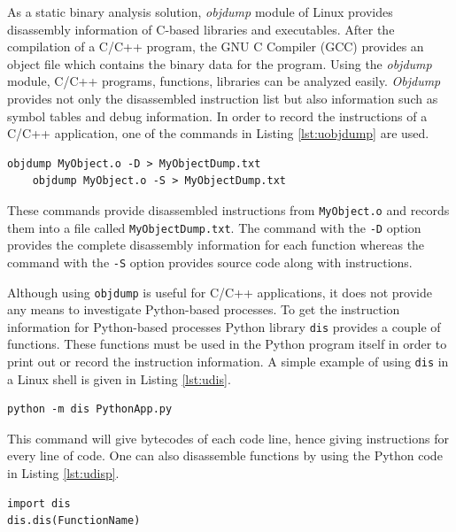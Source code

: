 As a static binary analysis solution, \textit{objdump} \cite{objdump} module of Linux provides disassembly information of C-based libraries and executables. After the compilation of a C/C++ program, the GNU C Compiler (GCC) provides an object file which contains the binary data for the program. Using the \textit{objdump} module, C/C++ programs, functions, libraries can be analyzed easily. \textit{Objdump} provides not only the disassembled instruction list but also information such as symbol tables and debug information. In order to record the instructions of a C/C++ application, one of the commands in Listing \ref{lst:uobjdump} are used.
\begin{lstlisting}[caption={Using objdump},label={lst:uobjdump},style=bash]
	objdump MyObject.o -D > MyObjectDump.txt
	objdump MyObject.o -S > MyObjectDump.txt
\end{lstlisting}
These commands provide disassembled instructions from \texttt{MyObject.o} and records them into a file called \texttt{MyObjectDump.txt}. The command with the \texttt{-D} option provides the complete disassembly information for each function whereas the command with the \texttt{-S} option provides source code along with instructions. 

Although using \texttt{objdump} is useful for C/C++ applications, it does not provide any means to investigate Python-based processes. To get the instruction information for Python-based processes Python library \texttt{dis} \cite{dis} provides a couple of functions. These functions must be used in the Python program itself in order to print out or record the instruction information. A simple example of using \texttt{dis} in a Linux shell is given in Listing \ref{lst:udis}.
\begin{lstlisting}[caption={Using dis},label={lst:udis},style=bash]
python -m dis PythonApp.py
\end{lstlisting}
This command will give bytecodes of each code line, hence giving instructions for every line of code. One can also disassemble functions by using the Python code in Listing \ref{lst:udisp}.
\begin{lstlisting}[caption={Using dis in Python shell},label={lst:udisp},style=bash]
import dis
dis.dis(FunctionName)
\end{lstlisting}
 
